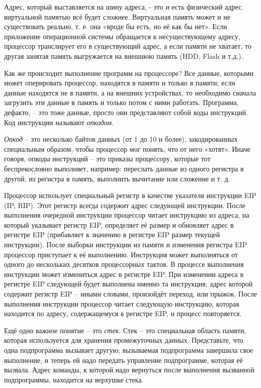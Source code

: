 	\par Адрес, который выставляется на шину адреса, - это и есть физический адрес. виртуальной памятью всё будет сложнее. Виртуальная память может и не существовать реально, т. е. она «вроде бы есть, но её как бы нет». Если приложение операционной системы обращается к несуществующему адресу, процессор транслирует его в существующий адрес, а если памяти не хватает, то другая занятая память выгружается на внешнюю память (HDD, Flash и т.д.). 
	
	\par Как же происходит выполнение программ на процессоре? Все данные, которыми может оперировать процессор, находятся в памяти и только в памяти; если данные находятся не в памяти, а на внешних устройствах, то необходимо сначала загрузить эти данные в память и только потом с ними работать. Программа, дефакто, – это тоже данные, просто они представляют собой коды инструкций. Код инструкции называют \textit{опкодом}. 
	
	\par \textit{Опкод} – это несколько байтов данных (от 1 до 10 и более), закодированных специальным образом, чтобы процессор мог понять, что от него «хотят». Иначе говоря, опкоды инструкций – это приказы процессору, которые тот беспрекословно выполняет, например: переслать данные из одного регистра в другой, из регистра в память, выполнить вычитание или сложение и т. д.
	
	\par Процессор использует специальный регистр в качестве указателя инструкции EIP (IP, RIP). Этот регистр всегда содержит адрес следующей инструкции. После выполнения очередной инструкции процессор читает инструкцию из адреса, на который указывает регистр EIP, определяет её размер и обновляет адрес в регистре EIP (прибавляет к значению в регистре EIP размер текущей инструкции). После выборки инструкции из памяти и изменения регистра EIP процессор приступает к её выполнению. Инструкция может выполняться от одного до нескольких десятков процессорных тактов. В процессе выполнения инструкции может измениться адрес в регистре EIP. При изменении адреса в регистре EIP следующей будет выполнена именно та инструкция, адрес которой содержит регистр EIP – иными словами, произойдёт переход, или прыжок. После выполнения инструкции процессор читает следующую инструкцию, которая находится по адресу, содержащемуся в регистре EIP, и процесс повторяется. 
	
	\par Ещё одно важное понятие – это \textit{стек}. Стек – это специальная область памяти, которая используется для хранения промежуточных данных. Представьте, что одна подпрограмма вызывает другую; вызываемая подпрограмма завершила свое выполнение, и теперь ей надо передать управление подпрограмме, которая её вызвала. Адрес команды, к которой надо вернуться после выполнения вызванной подпрограммы, находится на верхушке стека.
	
